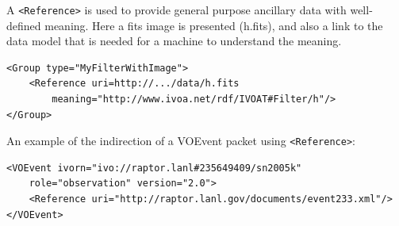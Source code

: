 \documentclass[11pt,a4paper]{ivoa}
\begin{document}
A {\tt <Reference>} is used to provide general purpose ancillary data with well-defined meaning. Here a fits image is presented (h.fits), and also a link to the data model that is needed for a machine to understand the meaning. 
{\footnotesize
\begin{verbatim}
<Group type="MyFilterWithImage">
    <Reference uri=http://.../data/h.fits 
        meaning="http://www.ivoa.net/rdf/IVOAT#Filter/h"/>
</Group> 
\end{verbatim}}
An example of the indirection of a VOEvent packet using {\tt <Reference>}:  
{\footnotesize
\begin{verbatim}
<VOEvent ivorn="ivo://raptor.lanl#235649409/sn2005k" 
    role="observation" version="2.0">   
    <Reference uri="http://raptor.lanl.gov/documents/event233.xml"/>
</VOEvent> 
\end{verbatim}}
\end{document}
